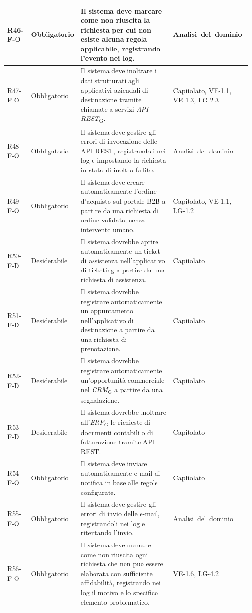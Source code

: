 {\begin{longtable}{|>{\raggedright\arraybackslash}p{1.8cm}|>{\raggedright\arraybackslash}p{2.3cm}|>{\raggedright\arraybackslash}p{6.6cm}|>{\raggedright\arraybackslash}p{3.1cm}|}
    \mbox{R46-F-O} & Obbligatorio & Il sistema deve marcare come non riuscita la richiesta per cui non esiste alcuna regola applicabile, registrando l'evento nei log. & \mbox{Analisi del dominio} \\ \hline
    \mbox{R47-F-O} & Obbligatorio & Il sistema deve inoltrare i dati strutturati agli applicativi aziendali di destinazione tramite chiamate a servizi \textit{API REST}\textsubscript{G}. & \mbox{Capitolato}, \mbox{VE-1.1}, \mbox{VE-1.3}, \mbox{LG-2.3} \\ \hline
    \mbox{R48-F-O} & Obbligatorio & Il sistema deve gestire gli errori di invocazione delle API REST, registrandoli nei log e impostando la richiesta in stato di inoltro fallito. & \mbox{Analisi del dominio} \\ \hline
    \mbox{R49-F-O} & Obbligatorio & Il sistema deve creare automaticamente l'ordine d'acquisto sul portale B2B a partire da una richiesta di ordine validata, senza intervento umano. & \mbox{Capitolato}, \mbox{VE-1.1}, \mbox{LG-1.2} \\ \hline
    \mbox{R50-F-D} & Desiderabile & Il sistema dovrebbe aprire automaticamente un ticket di assistenza nell'applicativo di ticketing a partire da una richiesta di assistenza. & \mbox{Capitolato} \\ \hline
    \mbox{R51-F-D} & Desiderabile & Il sistema dovrebbe registrare automaticamente un appuntamento nell'applicativo di destinazione a partire da una richiesta di prenotazione. & \mbox{Capitolato} \\ \hline
    \mbox{R52-F-D} & Desiderabile & Il sistema dovrebbe registrare automaticamente un'opportunità commerciale nel \textit{CRM}\textsubscript{G} a partire da una segnalazione. & \mbox{Capitolato} \\ \hline
    \mbox{R53-F-D} & Desiderabile & Il sistema dovrebbe inoltrare all'\textit{ERP}\textsubscript{G} le richieste di documenti contabili o di fatturazione tramite API REST. & \mbox{Capitolato} \\ \hline
    \mbox{R54-F-O} & Obbligatorio & Il sistema deve inviare automaticamente e-mail di notifica in base alle regole configurate. & \mbox{Capitolato} \\ \hline
    \mbox{R55-F-O} & Obbligatorio & Il sistema deve gestire gli errori di invio delle e-mail, registrandoli nei log e ritentando l'invio. & \mbox{Analisi del dominio} \\ \hline
    \mbox{R56-F-O} & Obbligatorio & Il sistema deve marcare come non riuscita ogni richiesta che non può essere elaborata con sufficiente affidabilità, registrando nei log il motivo e lo specifico elemento problematico. & \mbox{VE-1.6}, \mbox{LG-4.2} \\ \hline

\end{longtable}}
